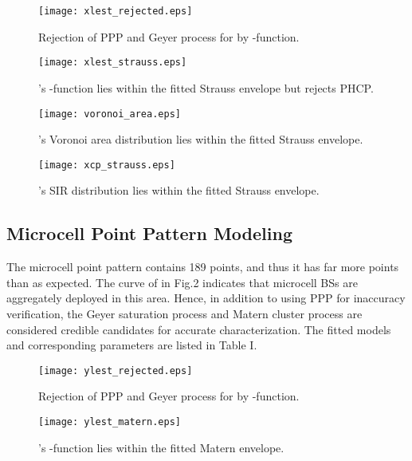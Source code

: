 \documentclass[conference]{IEEEtran}
\begin{document}
\begin{figure}[!t]
\centering
\texttt{[image: xlest\_rejected.eps]}
\caption{Rejection of PPP and Geyer process for  by -function.}
\end{figure}

\begin{figure}[!t]
\centering
\texttt{[image: xlest\_strauss.eps]}
\caption{'s -function lies within the fitted Strauss envelope but rejects PHCP.}
\end{figure}

\begin{figure}[!t]
\centering
\texttt{[image: voronoi\_area.eps]}
\caption{'s Voronoi area distribution lies within the fitted Strauss envelope.}
\end{figure}

\begin{figure}[!t]
\centering
\texttt{[image: xcp\_strauss.eps]}
\caption{'s SIR distribution lies within the fitted Strauss envelope.}
\end{figure}

\subsection{Microcell Point Pattern Modeling}

The microcell point pattern  contains 189 points, and thus it has far more points than  as expected. The  curve of  in Fig.2 indicates that microcell BSs are aggregately deployed in this area. Hence, in addition to using PPP for inaccuracy verification, the Geyer saturation process and Matern cluster process are considered credible candidates for accurate characterization. The fitted models and corresponding parameters are listed in Table I.

\begin{figure}[!t]
\centering
\texttt{[image: ylest\_rejected.eps]}
\caption{Rejection of PPP and Geyer process for  by -function.}
\end{figure}

\begin{figure}[!t]
\centering
\texttt{[image: ylest\_matern.eps]}
\caption{'s -function lies within the fitted Matern envelope.}
\end{figure}
\end{document}
